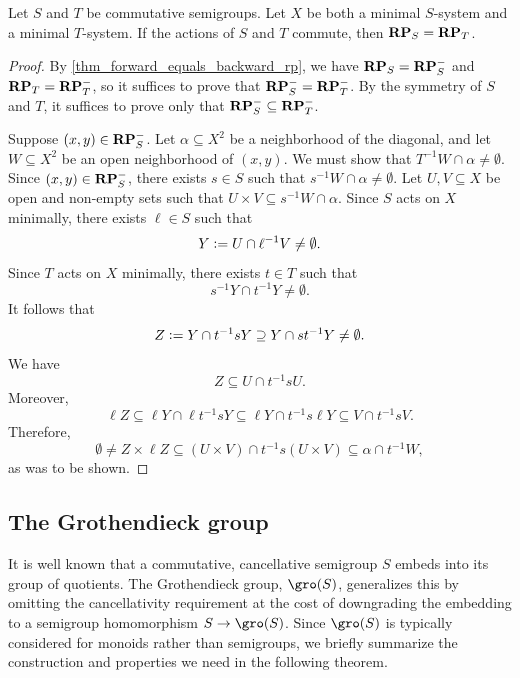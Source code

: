 \begin{theorem}
    \label{mainthm_same_rp_for_comm_actions}
    Let $S$ and $T$ be commutative semigroups.  Let $X$ be both a minimal $S$-system and a minimal $T$-system.  If the actions of $S$ and $T$ commute, then $\mathbf{RP}_S = \mathbf{RP}_T$.
\end{theorem}

\begin{proof}
    By \cref{thm_forward_equals_backward_rp}, we have $\mathbf{RP}_S = \mathbf{RP}_S^-$ and $\mathbf{RP}_T = \mathbf{RP}_T^-$, so it suffices to prove that $\mathbf{RP}_S^- = \mathbf{RP}_T^-$. By the symmetry of $S$ and $T$, it suffices to prove only that $\mathbf{RP}_S^- \subseteq \mathbf{RP}_T^-$.
    
    Suppose $(x,y) \in \mathbf{RP}_S^-$.  Let $\alpha \subseteq X^2$ be a neighborhood of the diagonal, and let $W \subseteq X^2$ be an open neighborhood of $(x,y)$.  We must show that $T^{-1} W \cap \alpha \neq \emptyset$.
    Since $(x,y) \in \mathbf{RP}_S^-$, there exists $s \in S$ such that $s^{-1} W \cap \alpha \neq \emptyset$.  Let $U, V \subseteq X$ be open and non-empty sets such that $U \times V \subseteq s^{-1} W \cap \alpha$.
    Since $S$ acts on $X$ minimally, there exists $\ell \in S$ such that
    \[Y \vcentcolon= U \cap \ell^{-1} V \neq \emptyset.\]
    Since $T$ acts on $X$ minimally, there exists  $t \in T$ such that
    \[s^{-1} Y \cap t^{-1} Y \neq \emptyset.\]
    It follows that
    \[
        Z \vcentcolon= Y \cap t^{-1} s Y \supseteq Y \cap s t^{-1} Y \neq \emptyset.
    \]
    We have
    \[
        Z \subseteq U \cap t^{-1} s U.
    \]
    Moreover, 
    \[
        \ell Z \subseteq \ell Y \cap \ell t^{-1} s Y \subseteq \ell Y \cap t^{-1} s \ell Y \subseteq V \cap t^{-1} s V.
    \]
    Therefore,
    \[\emptyset \neq Z \times \ell Z \subseteq (U \times V) \cap t^{-1} s (U \times V) \subseteq \alpha \cap t^{-1} W,\]
    as was to be shown.
\end{proof}

\subsection{The Grothendieck group}
\label{sec_gro_gp}

It is well known that a commutative, cancellative semigroup $S$ embeds into its group of quotients.
The Grothendieck group, $\gro(S)$, generalizes this by omitting the cancellativity requirement at the cost of downgrading the embedding to a semigroup homomorphism $S \to \gro(S)$.
Since $\gro(S)$ is typically considered for monoids rather than semigroups, we briefly summarize the construction and properties we need in the following theorem.

